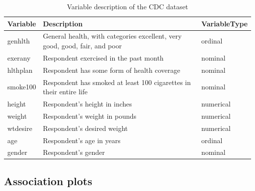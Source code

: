 \begin{Schunk}
\begin{table}

\caption{\label{tab:cdcdata}Variable description of the CDC dataset}
\centering
\begin{tabular}[t]{lll}
\toprule
Variable & Description & VariableType\\
\midrule
genhlth & General health, with categories excellent, very good, good, fair, and poor & ordinal\\
exerany & Respondent exercised in the past month & nominal\\
hlthplan & Respondent has some form of health coverage & nominal\\
smoke100 & Respondent has smoked at least 100 cigarettes in their entire life & nominal\\
height & Respondent's height in inches & numerical\\
\addlinespace
weight & Respondent's weight in pounds & numerical\\
wtdesire & Respondent's desired weight & numerical\\
age & Respondent's age in years & ordinal\\
gender & Respondent's gender & nominal\\
\bottomrule
\end{tabular}
\end{table}

\end{Schunk}

\hypertarget{association-plots}{%
\subsection{Association plots}\label{association-plots}}

